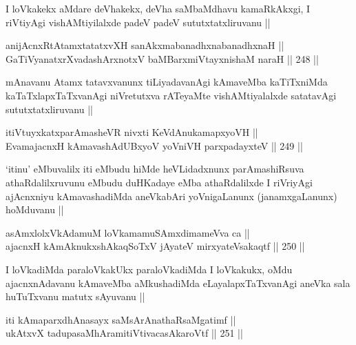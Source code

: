 \begin{artha}
I loVkakekx aMdare deVhakekx, deVha saMbaMdhavu kamaRkAkxgi, I
riVtiyAgi vishAMtiyilalxde padeV padeV sututxtatxliruvanu || 
\end{artha}


\begin{shl}
anijAcnxRtAtamxtatatxvXH sanAkxmabanadhxnabanadhxnaH || \\
GaTiVyanatxrXvadashArxnotxV baMBarxmiVtayxnishaM naraH ||  248 ||  
\end{shl}

\begin{artha}
mAnavanu Atamx tatavxvanunx tiLiyadavanAgi kAmaveMba kaTiTxniMda
kaTaTxlapxTaTxvanAgi niVretutxva rATeyaMte vishAMtiyalalxde satatavAgi
sututxtatxliruvanu ||
\end{artha}

\begin{shl}
itiVtuyxkatxparAmasheVR nivxti KeVdAnukamapxyoVH || \\
EvamajacnxH kAmavashAdUBxyoV yoVniVH parxpadayxteV ||  249 ||  
\end{shl}

\begin{artha}
`itinu' eMbuvalilx iti eMbudu hiMde heVLidadxnunx parAmashiRsuva
  athaRdalilxruvunu eMbudu duHKadaye eMba athaRdalilxde I riVriyAgi
  ajAcnxniyu kAmavashadiMda aneVkabAri yoVnigaLanunx (janamxgaLanunx)
  hoMduvanu ||
\end{artha}


\begin{shl}
asAmxlolxVkAdamuM loVkamamuSAmxdimameVva ca || \\
ajacnxH kAmAknukxshAkaqSoTxV jAyateV mirxyateV\s sakaqtf ||  250 ||  
\end{shl}

\begin{artha}
I loVkadiMda paraloVkakUkx paraloVkadiMda I loVkakukx, oMdu
ajacnxnAdavanu kAmaveMba aMkushadiMda eLayalapxTaTxvanAgi aneVka sala
huTuTxvanu matutx sAyuvanu ||
\end{artha}

\begin{shl}
iti kAmaparxdhAnasayx saMsArAnathaRsaMgatimf || \\
ukAtxvX tadupasaMhAramitiVtivacasA\s karoVtf ||  251 ||  
\end{shl}

